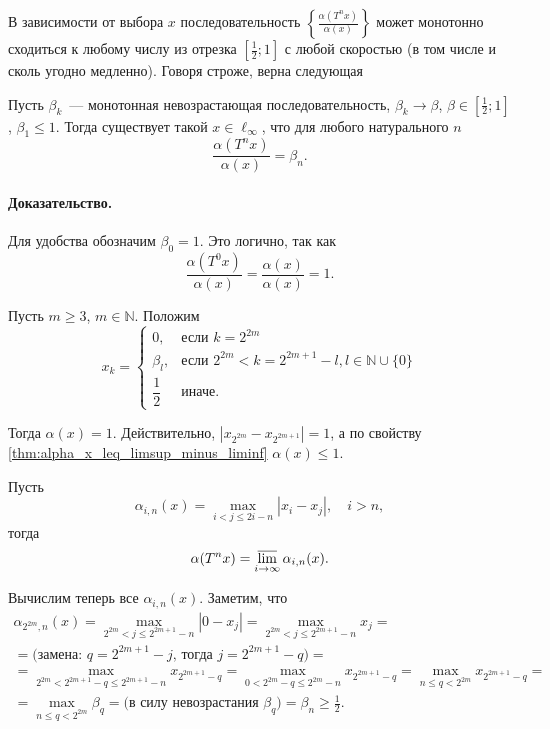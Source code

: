 В зависимости от выбора $x$ последовательность $\left\{\frac{\alpha(T^n x)}{\alpha(x)}\right\}$
может монотонно сходиться к любому числу из отрезка $\left[\frac{1}{2}; 1\right]$ с любой скоростью
(в том числе и сколь угодно медленно).
Говоря строже, верна следующая

\begin{theorem}
	Пусть $\beta_k$~--- монотонная невозрастающая последовательность,
	$\beta_k \to \beta$, $\beta\in\left[\frac{1}{2}; 1\right]$, $\beta_1 \leq 1$.
	Тогда существует такой $x\in\ell_\infty$, что для любого натурального $n$
	\begin{equation}
		\frac{\alpha(T^n x)}{\alpha(x)} = \beta_n.
	\end{equation}
\end{theorem}

\paragraph{Доказательство.}
Для удобства обозначим $\beta_0 = 1$.
Это логично, так как
\begin{equation}
	\frac{\alpha(T^0 x)}{\alpha(x)} = \frac{\alpha(x)}{\alpha(x)} = 1
	.
\end{equation}

Пусть $m\geq 3$, $m\in\mathbb{N}$.
Положим
\begin{equation}
	x_k = \begin{cases}
		0,  & \mbox{если } k = 2^{2m}     \\
		\beta_l,  & \mbox{если } 2^{2m} < k = 2^{2m+1}-l, l\in\mathbb{N}\cup\{0\}     \\
		\dfrac{1}{2}                    & \mbox{иначе.}
	\end{cases}
\end{equation}

Тогда $\alpha(x) = 1$.
Действительно, $\left| x_{2^{2m}} - x_{2^{2m+1}} \right| =1$,
а по свойству \ref{thm:alpha_x_leq_limsup_minus_liminf} $\alpha(x) \leq 1$.

Пусть
\begin{equation}
	\alpha_{i,n}(x)= \max_{i< j \leq 2i - n} |x_i - x_j|
	,
	\quad
	i>n
	,
\end{equation}
тогда
\begin{equation}
	\alpha(T^n x) = \varlimsup_{i \to \infty} \alpha_{i,n}(x)
	.
\end{equation}

Вычислим теперь все $\alpha_{i,n}(x)$.
Заметим, что
\begin{multline}
	\alpha_{2^{2m}, n} (x)
	=
	\max_{2^{2m}< j \leq 2^{2m+1} - n} |0 - x_j|
	=
	\max_{2^{2m}< j \leq 2^{2m+1} - n} x_j
	=
	\\=
	\mbox{(замена: $q = 2^{2m+1} - j$, тогда $j = 2^{2m+1} - q$)}
	=
	\\=
	\max_{2^{2m}< 2^{2m+1} - q \leq 2^{2m+1} - n} x_{2^{2m+1} - q}
	=
	\max_{0< 2^{2m} - q \leq 2^{2m} - n} x_{2^{2m+1} - q}
	=
	\max_{n \leq q < 2^{2m}} x_{2^{2m+1} - q}
	=
	\\=
	\max_{n \leq q < 2^{2m}} \beta_q
	=
	\mbox{(в силу невозрастания $\beta_q$)}
	=
	\beta_n
	\geq
	\frac{1}{2}
	.
\end{multline}

